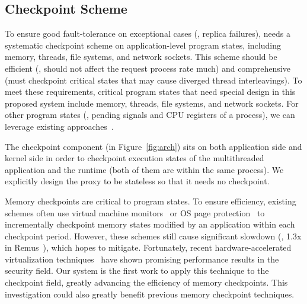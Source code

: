 



\subsection{Checkpoint Scheme} \label{sec:rep-checkpoint}

To ensure good fault-tolerance on exceptional cases (\eg, replica failures),
\crane needs a systematic checkpoint scheme on application-level program states,
including memory, threads, file systems, and network sockets. This scheme should
be efficient (\ie, should not affect the request process rate much) and
comprehensive (must checkpoint critical states that may cause diverged thread
interleavings). To meet these requirements, critical program states that need
special design in this proposed \crane system include memory, threads, file
systems, and network sockets. For other program states (\eg, pending signals and
CPU registers of a process), we can leverage existing
approaches~\cite{oren:atc07, dmtcp:ipdps09}.

The \crane checkpoint component (in Figure~\ref{fig:arch}) sits on both
application side and kernel side in order to checkpoint execution states of the
multithreaded application and the \smt runtime (both of them are within the
same process). We explicitly design the proxy to be stateless so that it needs
no checkpoint.

Memory checkpoints are critical to program states. To ensure efficiency,
existing schemes often use virtual machine monitors~\cite{remus:nsdi08} or OS
page protection~\cite{oren:atc07} to incrementally checkpoint memory states
modified by an application within each checkpoint period. However, these schemes
still cause significant slowdown (\eg, 1.3x in Remus~\cite{remus:nsdi08}), which
\crane hopes to mitigate. Fortunately, recent hardware-accelerated
virtualization techniques~\cite{dune:osdi12} have shown promising performance
results in the security field. Our \crane system is the first work to apply this
technique to the checkpoint field, greatly advancing the efficiency of memory
checkpoints. This investigation could also greatly benefit previous memory
checkpoint techniques.

